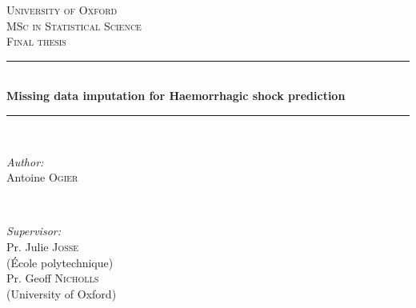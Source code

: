 \documentclass[12pt, a4paper]{memoir}
\begin{document}

\AtBeginShipoutNext{\AtBeginShipoutNext{\AtBeginShipoutDiscard}}
\begin{titlingpage}
	\newcommand{\HRule}{\rule{\linewidth}{0.5mm}} %
	
	\center %
	 
	
	\textsc{\LARGE University of Oxford}\\[1.5cm] %
	\textsc{\Large MSc in Statistical Science}\\[0.5cm] %
	\textsc{\large Final thesis}\\[0.5cm] %
	
	
	\HRule \\[0.4cm]
	{ \huge \bfseries Missing data imputation for Haemorrhagic shock prediction}\\[0.4cm] %
	\HRule \\[1.5cm]
	 
	
	\begin{minipage}{0.4\textwidth}
	\begin{flushleft} \large
	\emph{Author:}\\
	Antoine \textsc{Ogier} %
	\end{flushleft}
	\end{minipage}
	~
	\begin{minipage}{0.4\textwidth}
	\begin{flushright} \large
	\emph{Supervisor:} \\
	Pr. Julie \textsc{Josse} \\(École polytechnique) \\%
	Pr. Geoff \textsc{Nicholls} \\(University of Oxford) %
	

\end{flushright}
\end{minipage}
\end{titlingpage}
\end{document}
